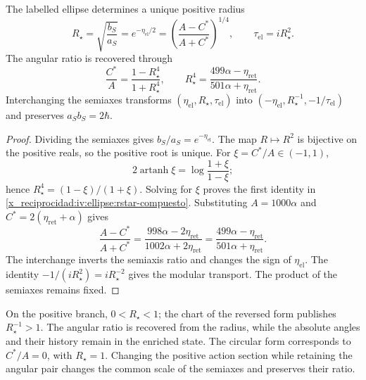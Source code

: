 \begin{proposition}
\label{x_reciprocidad:iv:ellipse:radio-prop}
The labelled ellipse determines a unique positive radius
\begin{equation}
 R_\star=\sqrt{\frac{b_S}{a_S}}
 =e^{-\eta_{\mathrm{el}}/2}
 =\left(\frac{A-C^*}{A+C^*}\right)^{1/4},
 \qquad \tau_{\mathrm{el}}=iR_\star^2.
 \label{x_reciprocidad:iv:ellipse:rstar}
\end{equation}
The angular ratio is recovered through
\begin{equation}
 \frac{C^*}{A}=\frac{1-R_\star^4}{1+R_\star^4},
 \qquad
 R_\star^4=
 \frac{499\alpha-\eta_{\mathrm{ret}}}
      {501\alpha+\eta_{\mathrm{ret}}}.
 \label{x_reciprocidad:iv:ellipse:rstar-compuesto}
\end{equation}
Interchanging the semiaxes transforms
\((\eta_{\mathrm{el}},R_\star,\tau_{\mathrm{el}})\) into
\((-\eta_{\mathrm{el}},R_\star^{-1},-1/\tau_{\mathrm{el}})\)
and preserves \(a_Sb_S=2\hbar\).
\end{proposition}
\begin{proof}
Dividing the semiaxes gives \(b_S/a_S=e^{-\eta_{\mathrm{el}}}\).
The map \(R\mapsto R^2\) is bijective on the positive
reals, so the positive root is unique.
For \(\xi=C^*/A\in(-1,1)\),
\[
 2\operatorname{artanh}\xi
 =\log\frac{1+\xi}{1-\xi};
\]
hence \(R_\star^4=(1-\xi)/(1+\xi)\).
Solving for \(\xi\) proves the first identity in
\eqref{x_reciprocidad:iv:ellipse:rstar-compuesto}. Substituting
\(A=1000\alpha\) and
\(C^*=2(\eta_{\mathrm{ret}}+\alpha)\) gives
\[
 \frac{A-C^*}{A+C^*}
 =\frac{998\alpha-2\eta_{\mathrm{ret}}}
        {1002\alpha+2\eta_{\mathrm{ret}}}
 =\frac{499\alpha-\eta_{\mathrm{ret}}}
        {501\alpha+\eta_{\mathrm{ret}}}.
\]
The interchange inverts the semiaxis ratio and changes the
sign of \(\eta_{\mathrm{el}}\). The identity
\(-1/(iR_\star^2)=iR_\star^{-2}\) gives the modular
transport. The product of the semiaxes remains fixed.
\end{proof}

On the positive branch, \(0<R_\star<1\); the chart of the
reversed form publishes \(R_\star^{-1}>1\). The angular ratio
is recovered from the radius, while the absolute angles
and their history remain in the enriched state.
The circular form corresponds to \(C^*/A=0\), with
\(R_\star=1\). Changing the positive action section
while retaining the angular pair changes the common scale of
the semiaxes and preserves their ratio.

